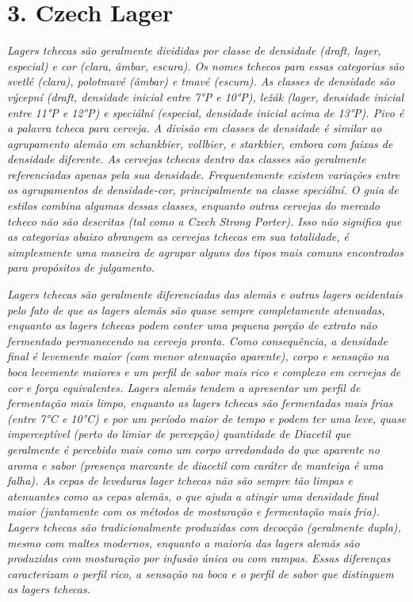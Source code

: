 \section*{3. Czech Lager}
\textit{Lagers tchecas são geralmente divididas por classe de densidade (draft, lager, especial) e cor (clara, âmbar, escura). Os nomes tchecos para essas categorias são svetlé (clara), polotmavé (âmbar) e tmavé (escura). As classes de densidade são výcepní (draft, densidade inicial entre 7°P e 10°P), ležák (lager, densidade inicial entre 11°P e 12°P) e speciální (especial, densidade inicial acima de 13°P). Pivo é a palavra tcheca para cerveja. A divisão em classes de densidade é similar ao agrupamento alemão em schankbier, vollbier, e starkbier, embora com faixas de densidade diferente. As cervejas tchecas dentro das classes são geralmente referenciadas apenas pela sua densidade. Frequentemente existem variações entre os agrupamentos de densidade-cor, principalmente na classe speciální. O guia de estilos combina algumas dessas classes, enquanto outras cervejas do mercado tcheco não são descritas (tal como a Czech Strong Porter). Isso não significa que as categorias abaixo abrangem as cervejas tchecas em sua totalidade, é simplesmente uma maneira de agrupar alguns dos tipos mais comuns encontrados para propósitos de julgamento.}

\textit{Lagers tchecas são geralmente diferenciadas das alemãs e outras lagers ocidentais pelo fato de que as lagers alemãs são quase sempre completamente atenuadas, enquanto as lagers tchecas podem conter uma pequena porção de extrato não fermentado permanecendo na cerveja pronta. Como consequência, a densidade final é levemente maior (com menor atenuação aparente), corpo e sensação na boca levemente maiores e um perfil de sabor mais rico e complexo em cervejas de cor e força equivalentes. Lagers alemãs tendem a apresentar um perfil de fermentação mais limpo, enquanto as lagers tchecas são fermentadas mais frias (entre 7°C e 10°C) e por um período maior de tempo e podem ter uma leve, quase imperceptível (perto do limiar de percepção) quantidade de Diacetil que geralmente é percebido mais como um corpo arredondado do que aparente no aroma e sabor (presença marcante de diacetil com caráter de manteiga é uma falha). As cepas de leveduras lager tchecas não são sempre tão limpas e atenuantes como as cepas alemãs, o que ajuda a atingir uma densidade final maior (juntamente com os métodos de mosturação e fermentação mais fria). Lagers tchecas são tradicionalmente produzidas com decocção (geralmente dupla), mesmo com maltes modernos, enquanto a maioria das lagers alemãs são produzidas com mosturação por infusão única ou com rampas. Essas diferenças caracterizam o perfil rico, a sensação na boca e o perfil de sabor que distinguem as lagers tchecas.}